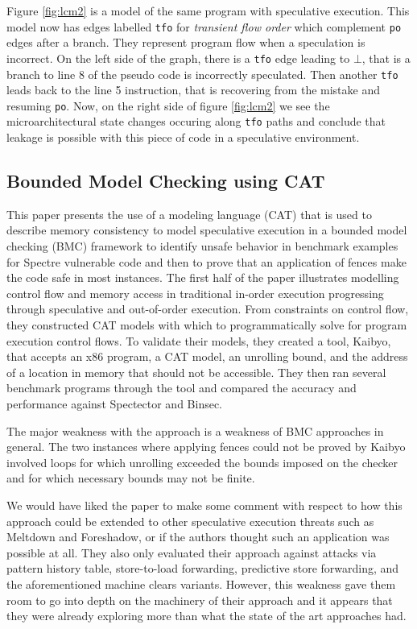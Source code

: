 \documentclass[11pt,conference]{IEEEtran}
\begin{document}
Figure \ref{fig:lcm2} is a model of the same program with speculative execution.
This model now has edges labelled \texttt{tfo} for \emph{transient flow order} which complement \texttt{po} edges after a branch.
They represent program flow when a speculation is incorrect.
On the left side of the graph, there is a \texttt{tfo} edge leading to $\bot$, that is a branch to line 8 of the pseudo code is incorrectly speculated.
Then another \texttt{tfo} leads back to the line 5 instruction, that is recovering from the mistake and resuming \texttt{po}.
Now, on the right side of figure \ref{fig:lcm2} we see the microarchitectural state changes occuring along \texttt{tfo} paths and conclude that leakage is possible with this piece of code in a speculative environment.

\subsection{Bounded Model Checking using CAT}
\cite{cats2022}

This paper presents the use of a modeling language (CAT) that is used to describe memory consistency to model speculative execution in a bounded model checking (BMC) framework to identify unsafe behavior in benchmark examples for Spectre vulnerable code and then to prove that an application of fences make the code safe in most instances.
The first half of the paper illustrates modelling control flow and memory access in traditional in-order execution progressing through speculative and out-of-order execution.
From constraints on control flow, they constructed CAT models with which to programmatically solve for program execution control flows.
To validate their models, they created a tool, Kaibyo, that accepts an x86 program, a CAT model, an unrolling bound, and the address of a location in memory that should not be accessible.
They then ran several benchmark programs through the tool and compared the accuracy and performance against Spectector and Binsec. 

The major weakness with the approach is a weakness of BMC approaches in general.
The two instances where applying fences could not be proved by Kaibyo involved loops for which unrolling exceeded the bounds imposed on the checker and for which necessary bounds may not be finite.

We would have liked the paper to make some comment with respect to how this approach could be extended to other speculative execution threats such as Meltdown and Foreshadow, or if the authors thought such an application was possible at all.
They also only evaluated their approach against attacks via pattern history table, store-to-load forwarding, predictive store forwarding, and the aforementioned machine clears variants.
However, this weakness gave them room to go into depth on the machinery of their approach and it appears that they were already exploring more than what the state of the art approaches had.
\end{document}
